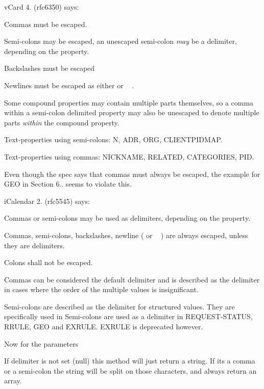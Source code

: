 v\+Card 4. (rfc6350) says\+:
\begin{DoxyItemize}
\item Commas must be escaped.
\item Semi-\/colons may be escaped, an unescaped semi-\/colon {\itshape may} be a delimiter, depending on the property.
\item Backslashes must be escaped
\item Newlines must be escaped as either  or ~\newline
.
\item Some compound properties may contain multiple parts themselves, so a comma within a semi-\/colon delimited property may also be unescaped to denote multiple parts {\itshape within} the compound property.
\item Text-\/properties using semi-\/colons\+: N, A\+DR, O\+RG, C\+L\+I\+E\+N\+T\+P\+I\+D\+M\+AP.
\item Text-\/properties using commas\+: N\+I\+C\+K\+N\+A\+ME, R\+E\+L\+A\+T\+ED, C\+A\+T\+E\+G\+O\+R\+I\+ES, P\+ID.
\end{DoxyItemize}

Even though the spec says that commas must always be escaped, the example for G\+EO in Section 6.. seems to violate this.

i\+Calendar 2. (rfc5545) says\+:
\begin{DoxyItemize}
\item Commas or semi-\/colons may be used as delimiters, depending on the property.
\item Commas, semi-\/colons, backslashes, newline ( or ~\newline
) are always escaped, unless they are delimiters.
\item Colons shall not be escaped.
\item Commas can be considered the \textquotesingle{}default delimiter\textquotesingle{} and is described as the delimiter in cases where the order of the multiple values is insignificant.
\item Semi-\/colons are described as the delimiter for \textquotesingle{}structured values\textquotesingle{}. They are specifically used in Semi-\/colons are used as a delimiter in R\+E\+Q\+U\+E\+S\+T-\/\+S\+T\+A\+T\+US, R\+R\+U\+LE, G\+EO and E\+X\+R\+U\+LE. E\+X\+R\+U\+LE is deprecated however.
\end{DoxyItemize}

Now for the parameters

If delimiter is not set (null) this method will just return a string. If it\textquotesingle{}s a comma or a semi-\/colon the string will be split on those characters, and always return an array.


